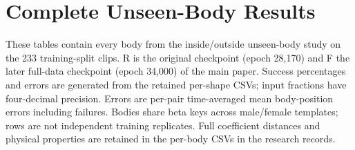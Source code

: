 \section{Complete Unseen-Body Results}\label{sup:unseen_tables}
These tables contain every body from the inside/outside unseen-body study on
the 233 training-split clips. R is the original checkpoint (epoch 28,170) and F
the later full-data checkpoint (epoch 34,000) of the main paper. Success
percentages and errors are generated from the retained per-shape CSVs; input
fractions have four-decimal precision. Errors are per-pair time-averaged mean
body-position errors including failures. Bodies share beta keys across
male/female templates; rows are not independent training replicates. Full
coefficient distances and physical properties are retained in the per-body CSVs
in the research records.

